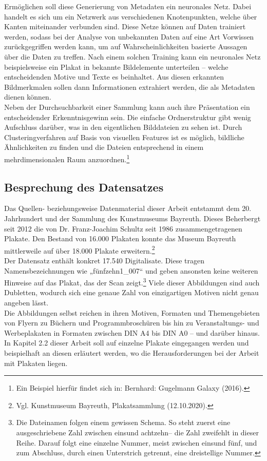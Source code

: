 \documentclass[a4paper,12pt,ngerman]{article}
\begin{document}
Ermöglichen soll diese Generierung von Metadaten ein neuronales Netz. Dabei handelt es sich um ein Netzwerk aus verschiedenen Knotenpunkten, welche über Kanten miteinander verbunden sind. Diese Netze können auf Daten trainiert werden, sodass bei der Analyse von unbekannten Daten auf eine Art Vorwissen zurückgegriffen werden kann, um auf Wahrscheinlichkeiten basierte Aussagen über die Daten zu treffen. Nach einem solchen Training kann ein neuronales Netz beispielsweise ein Plakat in bekannte Bildelemente unterteilen -- welche entscheidenden Motive und Texte es beinhaltet. Aus diesen erkannten Bildmerkmalen sollen dann Informationen extrahiert werden, die als Metadaten dienen können. \\
Neben der Durchsuchbarkeit einer Sammlung kann auch ihre Präsentation ein entscheidender Erkenntnisgewinn sein. Die einfache Ordnerstruktur gibt wenig Aufschluss darüber, was in den eigentlichen Bilddateien zu sehen ist. Durch Clusteringverfahren auf Basis von visuellen Features ist es möglich, bildliche Ähnlichkeiten zu finden und die Dateien entsprechend in einem mehrdimensionalen Raum anzuordnen.\footnote{Ein Beispiel hierfür findet sich in: Bernhard: Gugelmann Galaxy (2016).} \\

\subsection{Besprechung des Datensatzes}
Das Quellen- beziehungsweise Datenmaterial dieser Arbeit entstammt dem 20. Jahrhundert und der Sammlung des Kunstmuseums Bayreuth. Dieses Beherbergt seit 2012 die von Dr. Franz-Joachim Schultz seit 1986 zusammengetragenen Plakate. Den Bestand von 16.000 Plakaten konnte das Museum Bayreuth mittlerweile auf über 18.000 Plakate erweitern.\footnote{Vgl. Kunstmuseum Bayreuth, Plakatsammlung (12.10.2020).} \\
Der Datensatz enthält konkret 17.540 Digitalisate. Diese tragen Namensbezeichnungen wie „fünfzehn1\_007“ und geben ansonsten keine weiteren Hinweise auf das Plakat, das der Scan zeigt.\footnote{Die Dateinamen folgen einem gewissen Schema. So steht zuerst eine ausgeschriebene Zahl zwischen \glqq eins\grqq und \glqq achtzehn\grqq -- die Zahl \glqq zwei\grqq fehlt in dieser Reihe. Darauf folgt eine einzelne Nummer, meist zwischen \glqq eins\grqq und \glqq fünf\grqq , und zum Abschluss, durch einen Unterstrich getrennt, eine dreistellige Nummer.} Viele dieser Abbildungen sind auch Dubletten, wodurch sich eine genaue Zahl von einzigartigen Motiven nicht genau angeben lässt. \\
Die Abbildungen selbst reichen in ihren Motiven, Formaten und Themengebieten von Flyern zu Büchern und Programmbroschüren bis hin zu Veranstaltungs- und Werbeplakaten in Formaten zwischen DIN A4 bis DIN A0 -- und darüber hinaus. In Kapitel 2.2 dieser Arbeit soll auf einzelne Plakate eingegangen werden und beispielhaft an diesen erläutert werden, wo die Herausforderungen bei der Arbeit mit Plakaten liegen. \\
\end{document}
